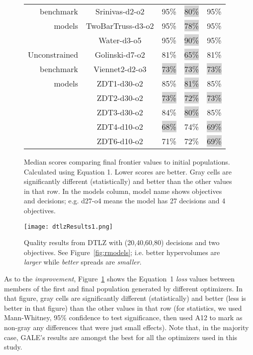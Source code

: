 \documentclass[10pt,journal,compsoc]{IEEEtran}
\newcommand{\fig}[1]{Figure~\ref{fig:#1}}
\begin{document}
\begin{figure}[!t]
\begin{tabular}{|r|c|c|c|c|}
benchmark&	Srinivas-d2-o2	&	95\%	&	\colorbox{lightgray}{80\%}	&	95\%	\\
models	&	TwoBarTruss-d3-o2	&	95\%	&	\colorbox{lightgray}{78\%}	&	95\%	\\
	&	Water-d3-o5	&	95\%	&	\colorbox{lightgray}{90\%}	&	95\%	\\ \hline
Unconstrained	&	Golinski-d7-o2	&	81\%	&	\colorbox{lightgray}{65\%}	&	81\%	\\
benchmark	&	Viennet2-d2-o3	&	\colorbox{lightgray}{73\%}	&	\colorbox{lightgray}{73\%}	&	\colorbox{lightgray}{73\%}	\\
models	&	ZDT1-d30-o2	&	85\%	&	\colorbox{lightgray}{81\%}	&	85\%	\\
	&	ZDT2-d30-o2	&	\colorbox{lightgray}{73\%}	&	\colorbox{lightgray}{72\%}	&	\colorbox{lightgray}{73\%}	\\
	&	ZDT3-d30-o2	&	84\%	&	\colorbox{lightgray}{80\%}	&	85\%	\\
	&	ZDT4-d10-o2	&	\colorbox{lightgray}{68\%}	&	74\%	&	\colorbox{lightgray}{69\%}	\\
	&	ZDT6-d10-o2	&	71\%	&	72\%	&	\colorbox{lightgray}{69\%}	\\ \hline
\end{tabular}
\caption{Median scores comparing final frontier values to
initial populations. Calculated using Equation 1. Lower
scores are better. Gray cells are significantly different
(statistically) and better than the other values in that row.
In the models column, model name shows objectives and decisions;
e.g. d27-o4 means
the model has 27 decisions and 4 objectives.  }
\label{fig:whateveryouwannacallme}
\end{figure}


\begin{figure}
\texttt{[image: dtlzResults1.png]}
\caption{Quality results from DTLZ with (20,40,60,80) decisions and two objectives.
See \fig{rmodels}; i.e. better hypervolumes are {\em larger} while {\em better} spreads are {\em smaller}.}\label{fig:dtlz}
\end{figure}


As to the {\em improvement}, 
 \fig{whateveryouwannacallme} shows the
Equation~1 {\em loss} values between members of the
first and final population generated by different
optimizers. In that figure,
 gray cells are significantly different
(statistically) and better (less is better in that figure)
than the other values in that row
(for statistics, we used Mann-Whitney, 95\%
confidence to test significance, then used A12 to
mark as non-gray any differences that were just
small effects). Note that, in the majority case, GALE's results
are amongst the best for all the optimizers used in this study.
\end{document}
